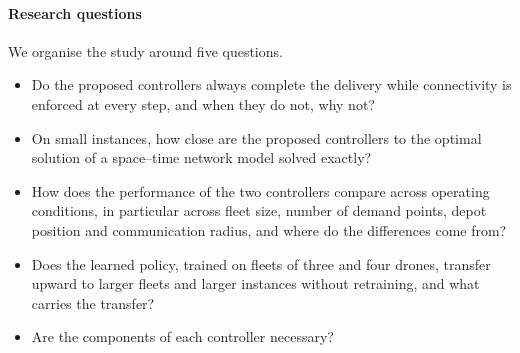 \documentclass[final,5p,times,twocolumn]{elsarticle}
\begin{document}
\paragraph{Research questions}
We organise the study around five questions.
\begin{itemize}
\item[\textbf{RQ1}] Do the proposed controllers always complete the delivery while connectivity
is enforced at every step, and when they do not, why not?
\item[\textbf{RQ2}] On small instances, how close are the proposed controllers to the optimal
solution of a space--time network model solved exactly?
\item[\textbf{RQ3}] How does the performance of the two controllers compare across operating
conditions, in particular across fleet size, number of demand points, depot position and
communication radius, and where do the differences come from?
\item[\textbf{RQ4}] Does the learned policy, trained on fleets of three and four drones, transfer
upward to larger fleets and larger instances without retraining, and what carries the transfer?
\item[\textbf{RQ5}] Are the components of each controller necessary?
\end{itemize}
\end{document}

